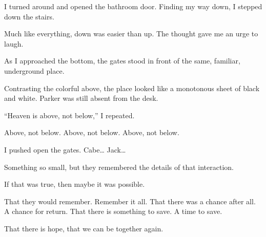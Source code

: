 I turned around and opened the bathroom door. Finding my way down, I stepped down the stairs.

Much like everything, down was easier than up. The thought gave me an urge to laugh. 

As I approached the bottom, the gates stood in front of the same, familiar, underground place.

Contrasting the colorful above, the place looked like a monotonous sheet of black and white. Parker was still absent from the desk.

“Heaven is above, not below,” I repeated.

Above, not below. Above, not below. Above, not below.

I pushed open the gates. Cabe… Jack…

Something so small, but they remembered the details of that interaction.

If that was true, then maybe it was possible.

That they would remember. Remember it all.
That there was a chance after all. A chance for return.
That there is something to save. A time to save.

That there is hope, that we can be together again.